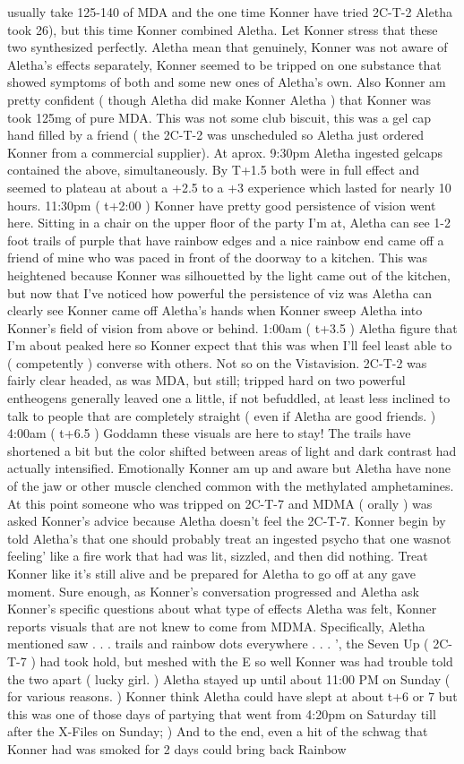 \documentclass[12pt]{book}
\begin{document}
usually take 125-140 of MDA and the one time Konner have tried 2C-T-2 Aletha took 26), but this time Konner combined Aletha. Let Konner stress that these two synthesized perfectly. Aletha mean that genuinely, Konner was not aware of Aletha's effects separately, Konner seemed to be tripped on one substance that showed symptoms of both and some new ones of Aletha's own. Also Konner am pretty confident ( though Aletha did make Konner Aletha ) that Konner was took 125mg of pure MDA. This was not some club biscuit, this was a gel cap hand filled by a friend ( the 2C-T-2 was unscheduled so Aletha just ordered Konner from a commercial supplier). At aprox. 9:30pm Aletha ingested gelcaps contained the above, simultaneously. By T+1.5 both were in full effect and seemed to plateau at about a +2.5 to a +3 experience which lasted for nearly 10 hours. 11:30pm ( t+2:00 ) Konner have pretty good persistence of vision went here. Sitting in a chair on the upper floor of the party I'm at, Aletha can see 1-2 foot trails of purple that have rainbow edges and a nice rainbow end came off a friend of mine who was paced in front of the doorway to a kitchen. This was heightened because Konner was silhouetted by the light came out of the kitchen, but now that I've noticed how powerful the persistence of viz was Aletha can clearly see Konner came off Aletha's hands when Konner sweep Aletha into Konner's field of vision from above or behind. 1:00am ( t+3.5 ) Aletha figure that I'm about peaked here so Konner expect that this was when I'll feel least able to ( competently ) converse with others. Not so on the Vistavision. 2C-T-2 was fairly clear headed, as was MDA, but still; tripped hard on two powerful entheogens generally leaved one a little, if not befuddled, at least less inclined to talk to people that are completely straight ( even if Aletha are good friends. ) 4:00am ( t+6.5 ) Goddamn these visuals are here to stay! The trails have shortened a bit but the color shifted between areas of light and dark contrast had actually intensified. Emotionally Konner am up and aware but Aletha have none of the jaw or other muscle clenched common with the methylated amphetamines. At this point someone who was tripped on 2C-T-7 and MDMA ( orally ) was asked Konner's advice because Aletha doesn't feel the 2C-T-7. Konner begin by told Aletha's that one should probably treat an ingested psycho that one wasnot feeling' like a fire work that had was lit, sizzled, and then did nothing. Treat Konner like it's still alive and be prepared for Aletha to go off at any gave moment. Sure enough, as Konner's conversation progressed and Aletha ask Konner's specific questions about what type of effects Aletha was felt, Konner reports visuals that are not knew to come from MDMA. Specifically, Aletha mentioned saw . . .  trails and rainbow dots everywhere . . .  ', the Seven Up ( 2C-T-7 ) had took hold, but meshed with the E so well Konner was had trouble told the two apart ( lucky girl. ) Aletha stayed up until about 11:00 PM on Sunday ( for various reasons. ) Konner think Aletha could have slept at about t+6 or 7 but this was one of those days of partying that went from 4:20pm on Saturday till after the X-Files on Sunday; ) And to the end, even a hit of the schwag that Konner had was smoked for 2 days could bring back Rainbow 
\end{document}
